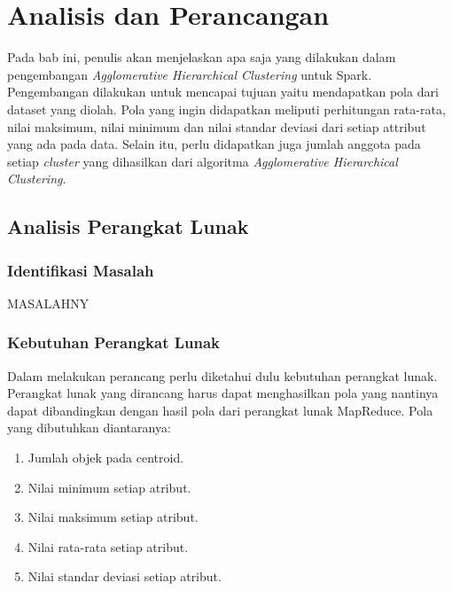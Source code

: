 \chapter{Analisis dan Perancangan}
\label{chap:Analisis dan Perancangan}

Pada bab ini, penulis akan menjelaskan apa saja yang dilakukan dalam pengembangan \textit{Agglomerative Hierarchical Clustering} untuk Spark. Pengembangan dilakukan untuk mencapai tujuan yaitu mendapatkan pola dari dataset yang diolah. Pola yang ingin didapatkan meliputi perhitungan rata-rata, nilai maksimum, nilai minimum dan nilai standar deviasi dari setiap attribut yang ada pada data. Selain itu, perlu didapatkan juga jumlah anggota pada setiap \textit{cluster} yang dihasilkan dari algoritma \textit{Agglomerative Hierarchical Clustering}.


\section{Analisis Perangkat Lunak}


\subsection{Identifikasi Masalah}
MASALAHNY


\subsection{Kebutuhan Perangkat Lunak}

Dalam melakukan perancang perlu diketahui dulu kebutuhan perangkat lunak. Perangkat lunak yang dirancang harus dapat menghasilkan pola yang nantinya dapat dibandingkan dengan hasil pola dari perangkat lunak MapReduce. Pola yang dibutuhkan diantaranya:

\begin{enumerate}

\item Jumlah objek pada centroid.

\item Nilai minimum setiap atribut.

\item Nilai maksimum setiap atribut.

\item Nilai rata-rata setiap atribut.

\item Nilai standar deviasi setiap atribut.
\end{enumerate}
 
